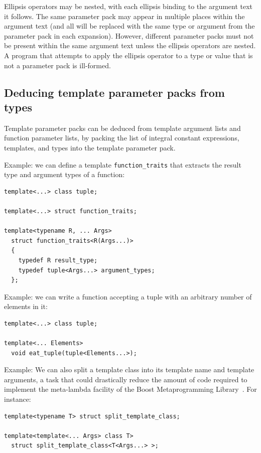 \documentclass{article}
\begin{document}
Ellipsis operators may be nested, with each ellipsis binding to the
argument text it follows. The same parameter pack may appear in
multiple places within the argument text (and all will be replaced
with the same type or argument from the parameter pack in each
expansion). However, different parameter packs must not be present
within the same argument text unless the ellipsis operators are
nested. A program that attempts to apply the ellipsis operator to a
type or value that is not a parameter pack is ill-formed.

\subsection{Deducing template parameter packs from types}
Template parameter packs can be deduced from template argument lists
and function parameter lists, by packing the list of integral constant
expressions, templates, and types into the template parameter pack.

Example: we can define a template {\tt function\_traits} that extracts
the result type and argument types of a function:
\begin{verbatim}
template<...> class tuple;

template<...> struct function_traits;

template<typename R, ... Args> 
  struct function_traits<R(Args...)>
  { 
    typedef R result_type; 
    typedef tuple<Args...> argument_types;
  };
\end{verbatim}

Example: we can write a function accepting a tuple with an arbitrary
number of elements in it:
\begin{verbatim}
template<...> class tuple;

template<... Elements>
  void eat_tuple(tuple<Elements...>);
\end{verbatim}

Example: We can also split a template class into its template name and
template arguments, a task that could drastically reduce the amount of
code required to implement the meta-lambda facility of the Boost
Metaprogramming Library~\cite{Gurtovoy02}. For instance:

\begin{verbatim}
template<typename T> struct split_template_class;

template<template<... Args> class T> 
  struct split_template_class<T<Args...> >;
\end{verbatim}
\end{document}

